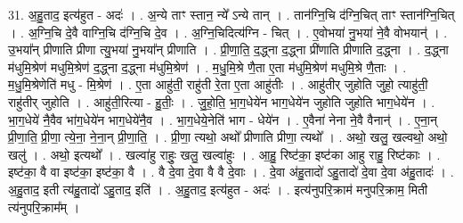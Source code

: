 \documentclass[17pt]{extarticle}
\begin{document}
31. अ॒हु॒ताद॒ इत्य॑हुत - अदः॑ । . अ॒न्ये ताꣳ स्तान॒ न्ये᳚ ऽन्ये तान् । . तान॑ग्नि॒चि द॑ग्नि॒चित् ताꣳ स्तान॑ग्नि॒चित् । . अ॒ग्नि॒चि दे॒वै वाग्नि॒चि द॑ग्नि॒चि दे॒व । . अ॒ग्नि॒चिदित्य॑ग्नि - चित् । . ए॒वोभया॑ नु॒भया॑ ने॒वै वोभयान्॑ । . उ॒भया᳚न् प्रीणाति प्रीणा त्यु॒भया॑ नु॒भया᳚न् प्रीणाति । . प्री॒णा॒ति॒ द॒द्ध्ना द॒द्ध्ना प्री॑णाति प्रीणाति द॒द्ध्ना । . द॒द्ध्ना म॑धुमि॒श्रेण॑ मधुमि॒श्रेण॑ द॒द्ध्ना द॒द्ध्ना म॑धुमि॒श्रेण॑ । . म॒धु॒मि॒श्रे णै॒ता ए॒ता म॑धुमि॒श्रेण॑ मधुमि॒श्रे णै॒ताः । . म॒धु॒मि॒श्रेणेति॑ मधु - मि॒श्रेण॑ । . ए॒ता आहु॑ती॒ राहु॑ती रे॒ता ए॒ता आहु॑तीः । . आहु॑तीर् जुहोति जुहो॒ त्याहु॑ती॒ राहु॑तीर् जुहोति । . आहु॑ती॒रित्या - हु॒तीः॒ । . जु॒हो॒ति॒ भा॒ग॒धेये॑न भाग॒धेये॑न जुहोति जुहोति भाग॒धेये॑न । . भा॒ग॒धेये॑ नै॒वैव भा॑ग॒धेये॑न भाग॒धेये॑नै॒व । . भा॒ग॒धेये॒नेति॑ भाग - धेये॑न । . ए॒वैना॑ नेना ने॒वै वैनान्॑ । . ए॒ना॒न् प्री॒णा॒ति॒ प्री॒णा॒ त्ये॒ना॒ ने॒ना॒न् प्री॒णा॒ति॒ । . प्री॒णा॒ त्यथो॒ अथो᳚ प्रीणाति प्रीणा॒ त्यथो᳚ । . अथो॒ खलु॒ खल्वथो॒ अथो॒ खलु॑ । . अथो॒ इत्यथो᳚ । . खल्वा॑हु राहुः॒ खलु॒ खल्वा॑हुः । . आ॒हु॒ रिष्ट॑का॒ इष्ट॑का आहु राहु॒ रिष्ट॑काः । . इष्ट॑का॒ वै वा इष्ट॑का॒ इष्ट॑का॒ वै । . वै दे॒वा दे॒वा वै वै दे॒वाः । . दे॒वा अ॑हु॒तादो॑ ऽहु॒तादो॑ दे॒वा दे॒वा अ॑हु॒तादः॑ । . अ॒हु॒ताद॒ इती त्य॑हु॒तादो॑ ऽहु॒ताद॒ इति॑ । . अ॒हु॒ताद॒ इत्य॑हुत - अदः॑ । . इत्य॑नुपरि॒क्राम॑ मनुपरि॒क्राम॒ मिती त्य॑नुपरि॒क्राम᳚म् । \newline
\end{document}
